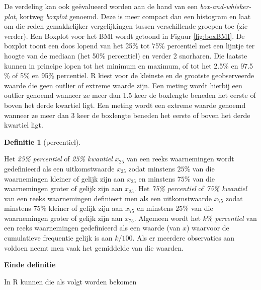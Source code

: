 \documentclass[
  12pt,dutch,coursenotes]{book}
\newenvironment{Shaded}{\begin{snugshade}}{\end{snugshade}}
\newcommand{\DataTypeTok}[1]{\textcolor[rgb]{0.13,0.29,0.53}{#1}}
\newcommand{\FloatTok}[1]{\textcolor[rgb]{0.00,0.00,0.81}{#1}}
\newcommand{\KeywordTok}[1]{\textcolor[rgb]{0.13,0.29,0.53}{\textbf{#1}}}
\newcommand{\NormalTok}[1]{#1}
\newcommand{\OperatorTok}[1]{\textcolor[rgb]{0.81,0.36,0.00}{\textbf{#1}}}
\newcommand{\OtherTok}[1]{\textcolor[rgb]{0.56,0.35,0.01}{#1}}
\theoremstyle{definition}
\newtheorem{definition}{Definitie}[chapter]
\theoremstyle{definition}
\theoremstyle{definition}
\theoremstyle{remark}
\begin{document}
De verdeling kan ook geëvalueerd worden aan de hand van een \emph{box-and-whisker-plot}, kortweg \emph{boxplot} genoemd. Deze is
meer compact dan een histogram en laat om die reden gemakkelijker
vergelijkingen tussen verschillende groepen toe (zie verder). Een Boxplot voor het BMI wordt getoond in Figuur \ref{fig:boxBMI}. De boxplot toont een
doos lopend van het 25\% tot 75\% percentiel met een lijntje ter hoogte van de
mediaan (het 50\% percentiel) en verder 2 snorharen. Die laatste kunnen in principe lopen tot het
minimum en maximum, of tot het 2.5\% en 97.5 \% of 5\% en 95\% percentiel.
R kiest voor de kleinste en de grootste geobserveerde waarde die geen
outlier of extreme waarde zijn. Een meting wordt hierbij een outlier genoemd
wanneer ze meer dan 1.5 keer de boxlengte beneden het eerste of boven het
derde kwartiel ligt. Een meting wordt een extreme waarde genoemd wanneer ze
meer dan 3 keer de boxlengte beneden het eerste of boven het derde kwartiel
ligt.

\begin{definition}[percentiel]
\protect\hypertarget{def:unnamed-chunk-90}{}{\label{def:unnamed-chunk-90} \iffalse (percentiel) \fi{} }
\end{definition}
Het \emph{25\% percentiel} of \emph{25\% kwantiel} \(x_{25}\) van een
reeks waarnemingen wordt gedefinieerd als een uitkomstwaarde \(x_{25}\) zodat
minstens \(25\%\) van die waarnemingen kleiner of gelijk zijn aan \(x_{25}\) en
minstens \(75\%\) van die waarnemingen groter of gelijk zijn aan \(x_{25}\). Het
\emph{75\% percentiel} of \emph{75\% kwantiel} van een reeks
waarnemingen definieert men als een uitkomstwaarde \(x_{75}\) zodat minstens 75\%
kleiner of gelijk zijn aan \(x_{75}\) en minstens \(25\%\) van die waarnemingen
groter of gelijk zijn aan \(x_{75}\). Algemeen wordt het \emph{\(k\%\)
percentiel} van een reeks waarnemingen gedefinieerd als een waarde (van \(x\))
waarvoor de cumulatieve frequentie gelijk is aan \(k/100.\) Als er meerdere
observaties aan voldoen neemt men vaak het gemiddelde van die waarden.

\textbf{Einde definitie}

In R kunnen die als volgt worden bekomen

\begin{Shaded}
\end{Shaded}
\end{document}
